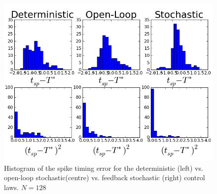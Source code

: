 \documentclass{article}
\begin{document}
\begin{figure}[h]
\begin{center}
  \includegraphics[width=.95\textwidth]
  {Figs/ControlSimulator/3controls_example_trajectories_hists.png}
  \caption[labelInTOC]{Histogram of the spike timing error for the
  deterministic (left) vs. open-loop stochastic(centre) vs. feedback stochastic
  (right) control laws. $N=128$}
  \label{fig:error_histograms_det_vs_openloop_vs_stoch} 
\end{center}
\end{figure}

% 
\end{document}

